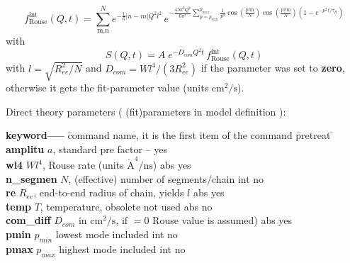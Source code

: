 \documentclass[11pt,fleqn]{book} %
\begin{document}
\begin{exercise}


\begin{equation}
\label{eq:rous}
f_{\text{Rouse}}^{\text{int}}\left( Q,t \right)\mathbf{=}\sum_{\text{m,n}}^{N}{e^{ - \frac{1}{6}|n - m| Q^{2}l^{2} } } \, e^{ - \frac{4 N l^{2}Q^2}{6 \pi^{2}}\sum_{p=p_{min}}^{p_{max}}{\frac{1}{p^{2}}\cos\left( \frac{\text{p$\pi$n}}{N} \right)}\cos\left( \frac{\text{p$\pi$m}}{N} \right)\left( 1 - e^{ - p^{2}\,{t}/{\tau_{R}} } \right) }
\end{equation}
with
\begin{equation}
\label{eq:rousD}
S(Q,t) = A \;e^{ - D_{com} Q^{2} t }\,f_{\mathrm{Rouse}}^{\mathrm{int}}\left( Q,t \right)
\end{equation}
with  $ l = \sqrt{R_{ee}^2/N}  $  
and
$D_{com} = W l^4 / (3 R_{ee}^2) $ if the parameter was set to {\bf zero}, otherwise 
it gets the fit-parameter value (units $\mathrm{cm^2/s}$).
\end{exercise}


Direct theory parameters ( (fit)parameters in model definition ):
\begin{tabbing}
\textbf{keyword-----}  \= command name, it is the first item of the command \= pretreat   \=   \kill     
\textbf{amplitu  } \>  $a$, standard pre factor                          \>  --        \> yes      \\    
\textbf{wl4      } \>  $W l^4$, Rouse rate (units ${\mathrm{\mathring{A}^4/ns}}$) \>  abs       \> yes      \\
\textbf{n\_segmen } \>  $N$, (effective) number of segments/chain        \>  int       \> no       \\              
\textbf{re       } \>  $R_{ee}$, end-to-end radius of chain, yields $l$ \>  abs       \> yes      \\
\textbf{temp     } \>  $T$, temperature, obsolete not used              \>  abs       \> no       \\
\textbf{com\_diff } \>  $D_{com}$ in ${\mathrm{cm^2/s}}$, if $=0$ Rouse value is assumed) \> abs \> yes \\
\textbf{pmin     } \>  $p_{min}$ lowest mode included                   \>  int       \> no       \\
\textbf{pmax     } \>  $p_{max}$ highest mode included                  \>  int       \> no       \\
\end{tabbing}
\end{document}
